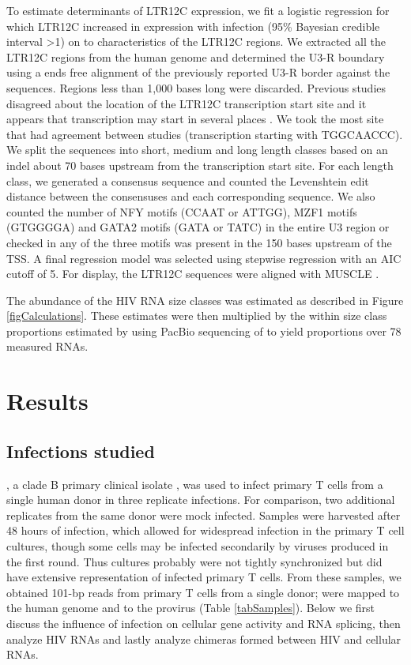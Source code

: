 \documentclass[../sherrill-Mix_thesis.tex]{subfiles}
\begin{document}
		To estimate determinants of LTR12C expression, we fit a logistic regression for which LTR12C increased in expression with \hivEight{} infection (95\% Bayesian credible interval \textgreater{}1) on to characteristics of the LTR12C regions. We extracted all the LTR12C regions from the human genome and determined the U3-R boundary using a ends free alignment of the previously reported U3-R border \citep{LaMantia1991,LaMantia1992,Plant2001,Ling2002,Yu2005} against the sequences. Regions less than 1,000 bases long were discarded. Previous studies disagreed about the location of the LTR12C transcription start site and it appears that transcription may start in several places \citep{LaMantia1992,Plant2001}. We took the \fivePrime{} most site that had agreement between studies (transcription starting with TGGCAACCC). We split the sequences into short, medium and long length classes based on an indel about 70 bases upstream from the transcription start site. For each length class, we generated a consensus sequence and counted the Levenshtein edit distance between the consensuses and each corresponding sequence. We also counted the number of NFY motifs (CCAAT or ATTGG), MZF1 motifs (GTGGGGA) and GATA2 motifs (GATA or TATC) in the entire U3 region or checked in any of the three motifs was present in the 150 bases upstream of the TSS. A final regression model was selected using stepwise regression with an AIC cutoff of 5. For display, the LTR12C sequences were aligned with MUSCLE \citep{Edgar2004}.

		The abundance of the HIV RNA size classes was estimated as described in Figure \ref{figCalculations}. These estimates were then multiplied by the within size class proportions estimated by \citet{Ocwieja2012} using PacBio sequencing of \hivEight{} to yield proportions over 78 measured \hivEight{} RNAs.
		

\section{Results}
	\subsection{Infections studied}
		\hivEight{}, a clade B primary clinical isolate \citep{Collman1992}, was used to infect primary \cdFour{} T cells from a single human donor in three replicate infections. For comparison, two additional replicates from the same donor were mock infected. Samples were harvested after 48 hours of infection, which allowed for widespread infection in the primary T cell cultures, though some cells may be infected secondarily by viruses produced in the first round.  Thus cultures probably were not tightly synchronized but did have extensive representation of infected primary T cells. From these samples, we obtained \nReads{} 101-bp reads from primary \cdFour{} T cells from a single donor; \nHuman{} were mapped to the human genome and \nHIV{} to the \hivEight{} provirus (Table \ref{tabSamples}). Below we first discuss the influence of infection on cellular gene activity and RNA splicing, then analyze HIV RNAs and lastly analyze chimeras formed between HIV and cellular RNAs.
\end{document}
